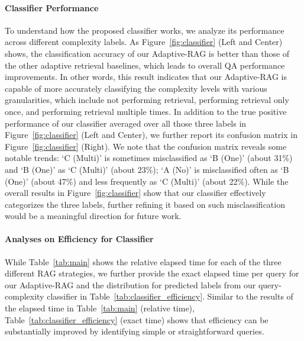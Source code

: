 %

\paragraph{Classifier Performance}
To understand how the proposed classifier works, we analyze its performance across different complexity labels. As Figure~\ref{fig:classifier} (Left and Center) shows, the classification accuracy of our Adaptive-RAG is better than those of the other adaptive retrieval baselines, which leads to overall QA performance improvements. In other words, this result indicates that our Adaptive-RAG is capable of more accurately classifying the complexity levels with various granularities, which include not performing retrieval, performing retrieval only once, and performing retrieval multiple times. In addition to the true positive performance of our classifier averaged over all those three labels in Figure~\ref{fig:classifier} (Left and Center), we further report its confusion matrix in Figure~\ref{fig:classifier} (Right). We note that the confusion matrix reveals some notable trends: `C (Multi)' is sometimes misclassified as `B (One)' (about 31\%) and `B (One)' as `C (Multi)' (about 23\%); `A (No)' is misclassified often as `B (One)' (about 47\%) and less frequently as `C (Multi)' (about 22\%). While the overall results in Figure~\ref{fig:classifier} show that our classifier effectively categorizes the three labels, further refining it based on such misclassification would be a meaningful direction for future work.

\paragraph{Analyses on Efficiency for Classifier}
While Table~\ref{tab:main} shows the relative elapsed time for each of the three different RAG strategies, we further provide the exact elapsed time per query for our Adaptive-RAG and the distribution for predicted labels from our query-complexity classifier in Table~\ref{tab:classifier_efficiency}. Similar to the results of the elapsed time in Table~\ref{tab:main} (relative time), Table~\ref{tab:classifier_efficiency} (exact time) shows that efficiency can be substantially improved by identifying simple or straightforward queries.











